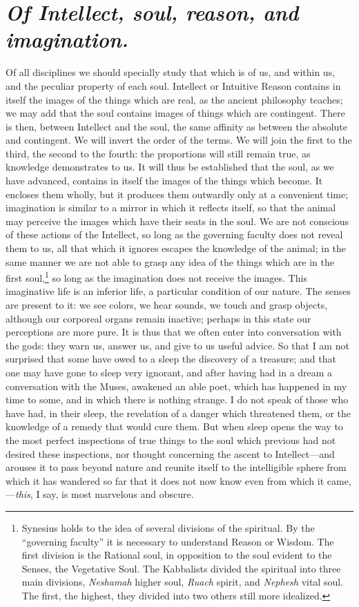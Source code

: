\documentclass[12pt]{article}
\begin{document}
\section{\mdseries\itshape Of Intellect, soul, reason, and imagination.}

Of all disciplines we should specially study that which is of us, and within
us, and the peculiar property of each soul. Intellect or Intuitive Reason
contains in itself the images of the things which are real, as the ancient
philosophy teaches; we may add that the soul contains images of things which
are contingent. There is then, between Intellect and the soul, the same
affinity as between the absolute and contingent. We will invert the order of
the terms. We will join the first to the third, the second to the fourth: the
proportions will still remain true, as knowledge demonstrates to us. It will
thus be established that the soul, as we have advanced, contains in itself the
images of the things which become. It encloses them wholly, but it produces
them outwardly only at a convenient time; imagination is similar to a mirror in
which it reflects itself, so that the animal may perceive the images which have
their seats in the soul. We are not conscious of these actions of the
Intellect, so long as the governing faculty does not reveal them to us, all
that which it ignores escapes the knowledge of the animal; in the same manner
we are not able to grasp any idea of the things which are in the first
soul,\footnote{Synesius holds to the idea of several divisions of the
spiritual. By the ``governing faculty'' it is necessary to understand Reason or
Wisdom. The first division is the Rational soul, in opposition to the soul
evident to the Senses, the Vegetative Soul. The Kabbalists divided the
spiritual into three main divisions, \textit{Neshamah} higher soul,
\textit{Ruach} spirit, and \textit{Nephesh} vital soul. The first, the highest,
they divided into two others still more idealized.} so long as the imagination
does not receive the images. This imaginative life is an inferior life, a
particular condition of our nature. The senses are present to it: we see
colors, we hear sounds, we touch and grasp objects, although our corporeal
organs remain inactive; perhaps in this state our perceptions are more pure. It
is thus that we often enter into conversation with the gods: they warn us,
answer us, and give to us useful advice. So that I am not surprised that some
have owed to a sleep the discovery of a treasure; and that one may have gone to
sleep very ignorant, and after having had in a dream a conversation with the
Muses, awakened an able poet, which has happened in my time to some, and in
which there is nothing strange. I do not speak of those who have had, in their
sleep, the revelation of a danger which threatened them, or the knowledge of a
remedy that would cure them. But when sleep opens the way to the most perfect
inspections of true things to the soul which previous had not desired these
inspections, nor thought concerning the ascent to Intellect---and arouses it to
pass beyond nature and reunite itself to the intelligible sphere from which it
has wandered so far that it does not now know even from which it
came,---\textit{this}, I say, is most marvelous and obscure.
\end{document}

